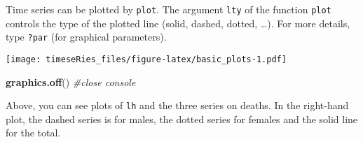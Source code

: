 \documentclass[]{book}
\newenvironment{Shaded}{\begin{snugshade}}{\end{snugshade}}
\newcommand{\CharTok}[1]{\textcolor[rgb]{0.31,0.60,0.02}{#1}}
\newcommand{\CommentTok}[1]{\textcolor[rgb]{0.56,0.35,0.01}{\textit{#1}}}
\newcommand{\DataTypeTok}[1]{\textcolor[rgb]{0.13,0.29,0.53}{#1}}
\newcommand{\DecValTok}[1]{\textcolor[rgb]{0.00,0.00,0.81}{#1}}
\newcommand{\KeywordTok}[1]{\textcolor[rgb]{0.13,0.29,0.53}{\textbf{#1}}}
\newcommand{\NormalTok}[1]{#1}
\newcommand{\StringTok}[1]{\textcolor[rgb]{0.31,0.60,0.02}{#1}}
\begin{document}
Time series can be plotted by \texttt{plot}. The argument \texttt{lty}
of the function \texttt{plot} controls the type of the plotted line
(solid, dashed, dotted, \ldots{}). For more details, type \texttt{?par}
(for graphical parameters).

\begin{Shaded}
\end{Shaded}

\texttt{[image: timeseRies\_files/figure-latex/basic\_plots-1.pdf]}

\begin{Shaded}
\begin{Highlighting}[]
\KeywordTok{graphics.off}\NormalTok{()  }\CommentTok{#close console}
\end{Highlighting}
\end{Shaded}

Above, you can see plots of \texttt{lh} and the three series on deaths.
In the right-hand plot, the dashed series is for males, the dotted
series for females and the solid line for the total.
\end{document}

